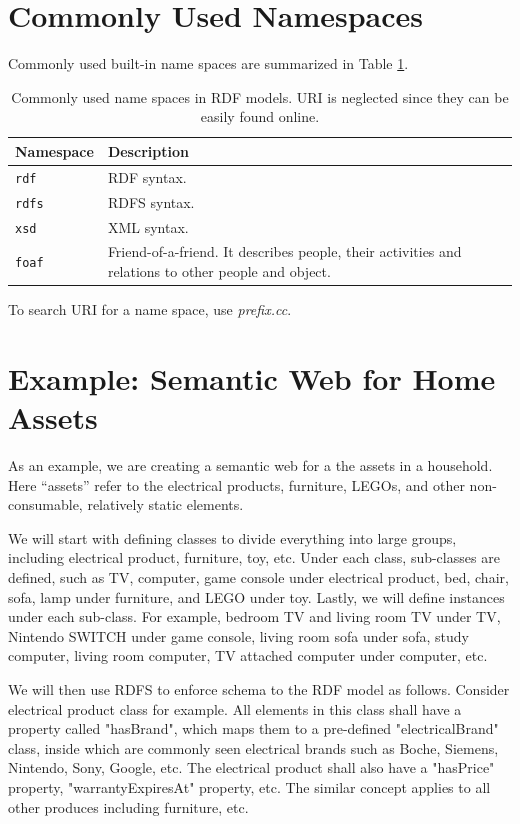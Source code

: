 \section{Commonly Used Namespaces}

Commonly used built-in name spaces are summarized in Table \ref{tab:commonnamespace}.

\begin{table}[!htb]
	\centering \caption{Commonly used name spaces in RDF models. URI is neglected since they can be easily found online.} \label{tab:commonnamespace}
	\begin{tabularx}{\textwidth}{lX}
		\hline
		Namespace & Description \\ \hline
		\verb|rdf| & RDF syntax. \\
		\verb|rdfs| & RDFS syntax. \\
		\verb|xsd|  & XML syntax. \\
		\verb|foaf| & Friend-of-a-friend. It describes people, their activities and relations to other people and object. \\
		\hline
	\end{tabularx}
\end{table}

To search URI for a name space, use \textit{prefix.cc}.

\section{Example: Semantic Web for Home Assets}

As an example, we are creating a semantic web for a the assets in a household. Here ``assets'' refer to the electrical products, furniture, LEGOs, and other non-consumable, relatively static elements. 

We will start with defining classes to divide everything into large groups, including electrical product, furniture, toy, etc. Under each class, sub-classes are defined, such as TV, computer, game console under electrical product, bed, chair, sofa, lamp under furniture, and LEGO under toy. Lastly, we will define instances under each sub-class. For example, bedroom TV and living room TV under TV, Nintendo SWITCH under game console, living room sofa under sofa, study computer, living room computer, TV attached computer under computer, etc.

We will then use RDFS to enforce schema to the RDF model as follows. Consider electrical product class for example. All elements in this class shall have a property called "hasBrand", which maps them to a pre-defined "electricalBrand" class, inside which are commonly seen electrical brands such as Boche, Siemens, Nintendo, Sony, Google, etc. The electrical product shall also have a "hasPrice" property, "warrantyExpiresAt" property, etc. The similar concept applies to all other produces including furniture, etc.

